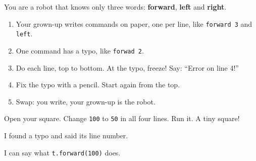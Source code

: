 
\begin{playathome}
You are a robot that knows only three words: \textbf{forward}, \textbf{left} and \textbf{right}.
\begin{enumerate}[leftmargin=1.4em,itemsep=2pt]
  \item Your grown-up writes commands on paper, one per line, like \texttt{forward 3} and \texttt{left}.
  \item One command has a typo, like \texttt{forwad 2}.
  \item Do each line, top to bottom. At the typo, freeze! Say: \enquote{Error on line 4!}
  \item Fix the typo with a pencil. Start again from the top.
  \item Swap: you write, your grown-up is the robot.
\end{enumerate}
\end{playathome}

\begin{playathome}
Open your square. Change \texttt{100} to \texttt{50} in all four lines. Run it. A tiny square!
\end{playathome}

\begin{selfcheck}
  \item I found a typo and said its line number.
  \item I can say what \texttt{t.forward(100)} does.
\end{selfcheck}
